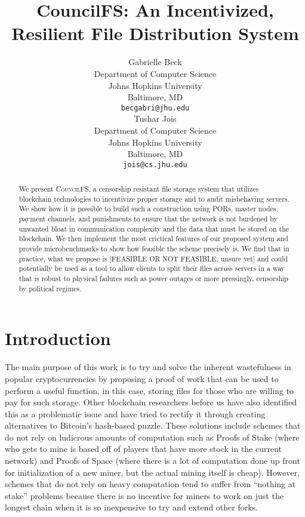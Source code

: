 \documentclass{article}
\title{CouncilFS: An Incentivized, Resilient File Distribution System}
\author{
  Gabrielle Beck \\
  Department of Computer Science\\
  Johns Hopkins University \\
 Baltimore, MD \\
  \texttt{becgabri@jhu.edu} \\
   \And
 Tushar Jois \\
  Department of Computer Science\\
  Johns Hopkins University\\
  Baltimore, MD \\
  \texttt{jois@cs.jhu.edu} \\
}
\begin{document}
\maketitle

\begin{abstract}
  We present \textsc{CouncilFS}, a censorship resistant file storage system that utilizes blockchain technologies to incentivize proper storage and to audit misbehaving servers. We show how it is possible to build such a construction using PORs, master nodes, payment channels, and punishments to ensure that the network is not burdened by unwanted bloat in communication complexity and the data that must be stored on the blockchain. We then implement the most crictical features of our proposed system and provide microbenchmarks to show how feasible the scheme precisely is. We find that in practice, what we propose is [FEASIBLE OR NOT FEASIBLE, unsure yet] and could potentially be used as a tool to allow clients to split their files across servers in a way that is robust to physical failures such as power outages or more pressingly, censorship by political regimes. 
\end{abstract}




\section{Introduction}

The main purpose of this work is to try and solve the inherent wastefulness in
popular cryptocurrencies by proposing a proof of work that can be used to
perform a useful function, in this case, storing files for those who are willing
to pay for such storage. Other blockchain researchers before us have also
identified this as a problematic issue and have tried to rectify it through
creating alternatives to Bitcoin’s hash-based puzzle. These solutions include
schemes that do not rely on ludicrous amounts of computation such as Proofs of
Stake (where who gets to mine is based off of players that have more stock in
the current network) and Proofs of Space (where there is a lot of computation
done up front for initialization of a new miner, but the actual mining itself is
cheap). However, schemes that do not rely on heavy computation tend to suffer
from “nothing at stake” problems because there is no incentive for miners to
work on just the longest chain when it is so inexpensive to try and extend other
forks.
\end{document}
